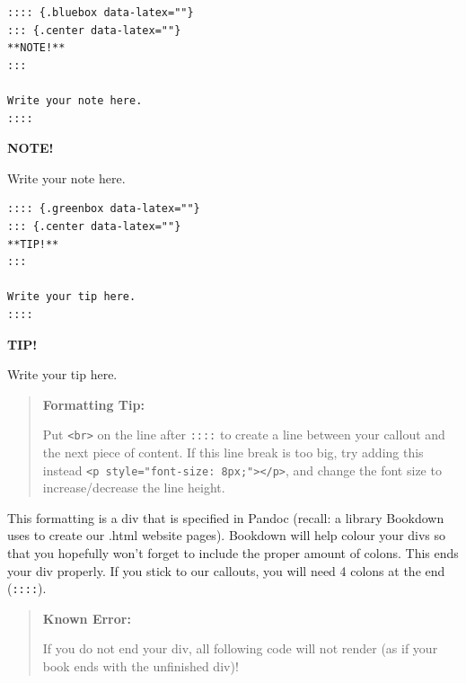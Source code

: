 \documentclass[
]{book}
\newenvironment{bluebox}{
  \definecolor{shadecolor}{RGB}{172, 210, 237}
  \color{white}
  \begin{shaded}}
 {\end{shaded}}
\newenvironment{greenbox}{
  \definecolor{shadecolor}{RGB}{141, 181, 128}
  \color{white}
  \begin{shaded}}
 {\end{shaded}}
\theoremstyle{definition}
\theoremstyle{definition}
\theoremstyle{definition}
\theoremstyle{definition}
\theoremstyle{remark}
\begin{document}
\begin{verbatim}
:::: {.bluebox data-latex=""}
::: {.center data-latex=""}
**NOTE!**
:::

Write your note here.
::::
\end{verbatim}

\begin{bluebox}

\begin{center}
\textbf{NOTE!}

\end{center}

Write your note here.

\end{bluebox}

\begin{verbatim}
:::: {.greenbox data-latex=""}
::: {.center data-latex=""}
**TIP!**
:::

Write your tip here.
::::
\end{verbatim}

\begin{greenbox}

\begin{center}
\textbf{TIP!}

\end{center}

Write your tip here.

\end{greenbox}

\begin{quote}
\textbf{Formatting Tip:}

Put \texttt{\textless{}br\textgreater{}} on the line after \texttt{::::} to create a line between your callout and the next piece of content. If this line break is too big, try adding this instead \texttt{\textless{}p\ style="font-size:\ 8px;"\textgreater{}\textless{}/p\textgreater{}}, and change the font size to increase/decrease the line height.
\end{quote}

This formatting is a div that is specified in Pandoc (recall: a library Bookdown uses to create our .html website pages). Bookdown will help colour your divs so that you hopefully won't forget to include the proper amount of colons. This ends your div properly. If you stick to our callouts, you will need 4 colons at the end (\texttt{::::}).

\begin{quote}
\textbf{Known Error:}

If you do not end your div, all following code will not render (as if your book ends with the unfinished div)!
\end{quote}
\end{document}
